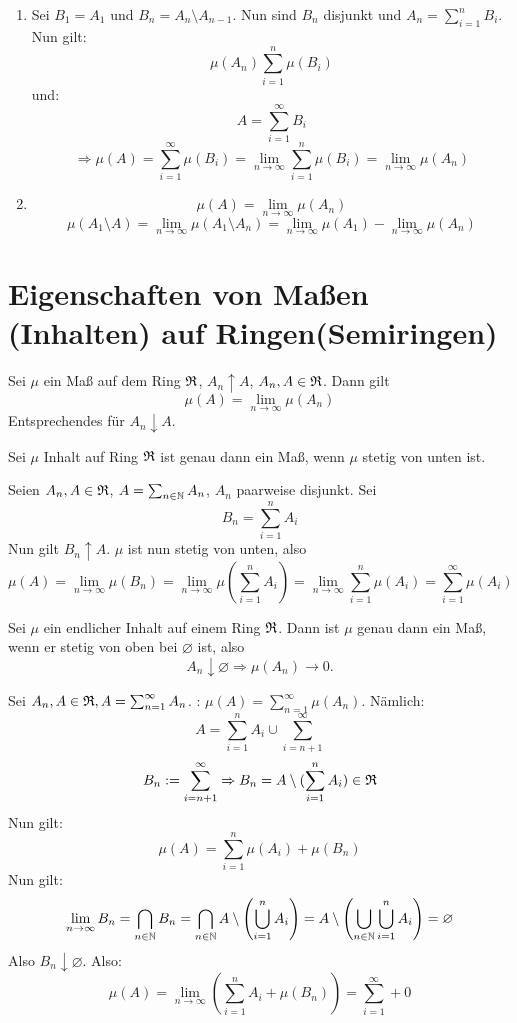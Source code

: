 		\begin{bew}
			\begin{enumerate}
				\item Sei $B_1=A_1$ und $B_n=A_n\setminus A_{n-1}$. Nun sind $B_n$ disjunkt und $A_n=\sum_{i=1}^n B_i$. Nun gilt:
				\[ \mu(A_n)\sum_{i=1}^n \mu(B_i) \]
				und:
				\[ A=\sum_{i=1}^\infty B_i \]
				\[ \Rightarrow \mu(A)=\sum_{i=1}^\infty \mu(B_i)=\lim_{n\to\infty}\sum_{i=1}^n \mu(B_i)=\lim_{n\to\infty} \mu(A_n) \]
				\item 
				\[ \mu(A)=\lim_{n\to\infty}\mu(A_n) \]
				\[ \mu(A_1\setminus A)=\lim_{n\to\infty} \mu(A_1\setminus A_n)=\lim_{n\to\infty} \mu(A_1)-\lim_{n\to\infty} \mu(A_n) \]
			\end{enumerate}
		\end{bew}
			
		\section{Eigenschaften von Maßen (Inhalten) auf Ringen(Semiringen)}
			\begin{satz}
				Sei $\mu$ ein Maß auf dem Ring $\mathfrak{R}$, $A_n\uparrow A$, $A_n, A\in \mathfrak{R}$. Dann gilt
				\[ \mu(A)=\lim_{n\to\infty} \mu(A_n) \]
				Entsprechendes für $A_n\downarrow A$.
			\end{satz}
			\begin{satz}
				Sei $\mu$ Inhalt auf Ring $\mathfrak{R}$ ist genau dann ein Maß, wenn $\mu$ stetig von unten ist.
			\end{satz}
			\begin{bew}
				Seien $A_n, A\in\mathfrak{R}$, $A=\sum_{n\in\mathbb{N}} A_n$, $A_n$ paarweise disjunkt. Sei 
				\[ B_n=\sum_{i=1}^n A_i \]
				Nun gilt $B_n\uparrow A$. $\mu$ ist nun stetig von unten, also
				\[ \mu(A)=\lim_{n\to\infty}\mu(B_n)=\lim_{n\to\infty}\mu(\sum_{i=1}^n A_i)=\lim_{n\to\infty} \sum_{i=1}^n \mu(A_i)=\sum_{i=1}^\infty \mu(A_i) \]\arge
			\end{bew}
			\begin{satz}
				Sei $\mu$ ein endlicher Inhalt auf einem Ring $\mathfrak{R}$. Dann ist $\mu$ genau dann ein Maß, wenn er stetig von oben bei $\varnothing$ ist, also
				\[ A_n\downarrow \varnothing\Rightarrow \mu(A_n)\to 0. \]
			\end{satz}
			
			\begin{bew}
				Sei $A_n,A\in\mathfrak{R}, A=\sum_{n=1}^\infty A_n$. \newline
				\zz: $\mu(A)=\sum_{n=1}^\infty \mu(A_n)$. \newline
				Nämlich:
				\[ A=\sum_{i=1}^n A_i\cup \sum_{i=n+1}^\infty \]
				\[ B_n:=\sum_{i=n+1}^\infty \Rightarrow B_n=A\setminus(\sum_{i=1}^n A_i)\in\mathfrak{R} \]
				Nun gilt:
				\[ \mu(A)=\sum_{i=1}^n \mu(A_i)+\mu(B_n) \]
				Nun gilt:
				\[ \lim_{n\to\infty} B_n=\bigcap_{n\in\mathbb{N}} B_n=\bigcap_{n\in\mathbb{N}} A\setminus \left(\bigcup_{i=1}^n A_i\right)=A\setminus\left(\bigcup_{n\in\mathbb{N}}\bigcup_{i=1}^n A_i\right)=\varnothing \]
				Also $B_n\downarrow \varnothing$. Also:
				\[ \mu(A)=\lim_{n\to\infty} \left( \sum_{i=1}^n A_i + \mu(B_n)\right)=\sum_{i=1}^\infty + 0 \]
				\arge
			\end{bew}
			
